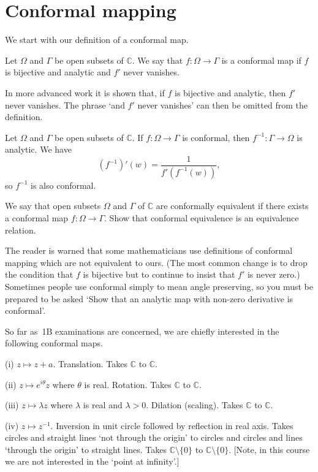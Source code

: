 \section{Conformal mapping} We start with our definition
of a conformal map.
\begin{definition} Let $\Omega$ and $\Gamma$ be open subsets 
of ${\mathbb C}$. We say that $f:\Omega\rightarrow\Gamma$
is a conformal map if $f$ is bijective and analytic
and $f'$ never vanishes.
\end{definition}
In more advanced work it is shown that, if 
$f$ is bijective and analytic, then $f'$ never
vanishes. The phrase `and $f'$ never vanishes' can
then be omitted from the definition.
\begin{lemma}\label{L conformal inverse} 
Let $\Omega$ and $\Gamma$ be open subsets 
of ${\mathbb C}$. If $f:\Omega\rightarrow\Gamma$
is conformal, then $f^{-1}:\Gamma\rightarrow\Omega$
is analytic. We have
\[(f^{-1})'(w)=\frac{1}{f'(f^{-1}(w))},\]
so $f^{-1}$ is also conformal.
\end{lemma}
\begin{exercise}\label{E, conformal equivalence} 
We say that open subsets $\Omega$ and $\Gamma$
of ${\mathbb C}$ are conformally equivalent 
if there exists a conformal map $f:\Omega\rightarrow\Gamma$.
Show that conformal equivalence is an equivalence relation.
\end{exercise}
The reader is warned that some mathematicians use
definitions of conformal mapping
which are not equivalent
to ours. (The most common change is to drop the
condition that $f$ is bijective but to continue
to insist that $f'$ is never zero.) Sometimes
people use conformal simply to mean angle
preserving, so you must be prepared to be asked
`Show that an analytic map with non-zero derivative
is conformal'.

So far as~1B examinations are concerned, we are chiefly 
interested in the following conformal maps.

(i) $z\mapsto z+a$. Translation. Takes ${\mathbb C}$ to
${\mathbb C}$.

(ii) $z\mapsto e^{i\theta}z$ where $\theta$ is real. 
Rotation. Takes ${\mathbb C}$ to ${\mathbb C}$.

(iii) $z\mapsto \lambda z$ where $\lambda$ is real and $\lambda>0$.
Dilation (scaling). Takes ${\mathbb C}$ to ${\mathbb C}$.

(iv) $z\mapsto z^{-1}$. Inversion in unit circle
followed by reflection in real axis. Takes circles and straight 
lines `not through the origin' to circles
and circles and lines `through the origin'
to straight lines.
Takes ${\mathbb C}\setminus\{0\}$ to ${\mathbb C}\setminus\{0\}$.
[Note, in this course we are not interested in the
`point at infinity'.]


